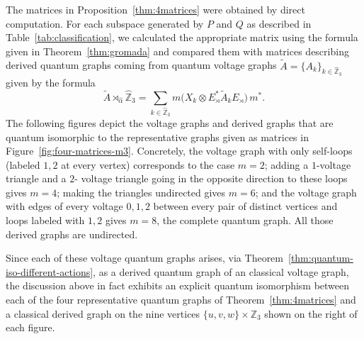 The matrices in Proposition~\ref{thm:4matrices} were obtained
by direct computation. For each subspace generated by \( P \) and \( Q \)
as described in Table~\ref{tab:classification}, we calculated the
appropriate matrix using the formula given in
Theorem~\ref{thm:gromada} and compared them with matrices describing
derived quantum graphs coming from quantum voltage graphs \(\widetilde{A}
= \{A_k\}_{k \in \hat{\mathbb{Z}}_3} \) given by the formula
\[
    \widetilde{A} \rtimes_{\hat\alpha} \hat{\mathbb{Z}}_3
    = \sum_{k \in \hat{\mathbb{Z}}_3} m\big( X_k \otimes E_\rtimes^*
    \widetilde{A}_k E_\rtimes \big)\, m^*.
\]
The following figures depict the voltage graphs and derived graphs
that are quantum isomorphic to the representative graphs given as
matrices in
Figure~\ref{fig:four-matrices-m3}. Concretely, the voltage graph with
only self-loops (labeled \( 1,2 \) at every vertex) corresponds to the
case \( m=2 \); adding a \( 1 \)-voltage triangle and a \( 2 \)-
voltage triangle going in the opposite direction to these
loops gives \( m=4 \); making the triangles undirected gives \( m=6
\); and the voltage graph with edges of
every voltage \( 0,1,2 \) between every pair of distinct vertices and
loops labeled with \( 1,2 \) gives
\( m=8 \), the complete quantum graph. All those derived graphs are undirected.



Since each of these voltage quantum graphs arises, via
Theorem~\ref{thm:quantum-iso-different-actions}, as a
derived quantum graph of an classical voltage graph, the
discussion above in fact exhibits an explicit quantum isomorphism
between each of the four representative quantum graphs of
Theorem~\ref{thm:4matrices} and a classical derived graph on the
nine vertices \( \{u,v,w\} \times \mathbb{Z}_3 \) shown on the
right of each figure.

